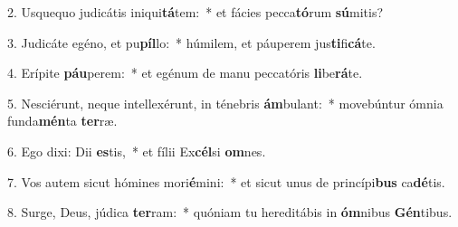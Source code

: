 2. Usquequo judicátis iniqui\textbf{tá}tem:~*  et fácies pecca\textbf{tó}rum \textbf{sú}mitis?\

3. Judicáte egéno, et pu\textbf{píl}lo:~*  húmilem, et páuperem jus\textbf{ti}fi\textbf{cá}te.\

4. Erípite \textbf{páu}perem:~*  et egénum de manu peccatóris \textbf{li}be\textbf{rá}te.\

5. Nesciérunt, neque intellexérunt, in ténebris \textbf{ám}bulant:~*  movebúntur ómnia funda\textbf{mén}ta \textbf{ter}ræ.\

6. Ego dixi: Dii \textbf{es}tis,~*  et fílii Ex\textbf{cél}si \textbf{om}nes.\

7. Vos autem sicut hómines mori\textbf{é}mini:~*  et sicut unus de princípi\textbf{bus} ca\textbf{dé}tis.\

8. Surge, Deus, júdica \textbf{ter}ram:~*  quóniam tu hereditábis in \textbf{óm}nibus \textbf{Gén}tibus.\

